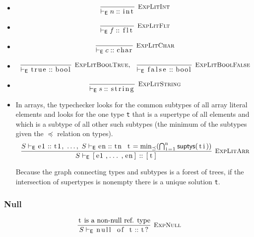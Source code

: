 \documentclass{article}
\newcommand{\code}[1]{\lstinline[columns=fixed]{#1}}
\newcommand{\drmrule}[5]{\frac{#1}{#2\vdash_{\mathsf{#3}}#4}\textsc{\ \small{#5}}}
\newcommand{\ruleapp}[1]{\vdash_{\mathsf{#1}}}
\newcommand{\mc}[1]{\textnormal{\code{#1}}}
\begin{document}
				\begin{itemize}
					\item
						\begin{align*}
							\drmrule{}{}{E}{n :: \mc{int}}{ExpLitInt}
						\end{align*}
					\item
						\begin{align*}
							\drmrule{}{}{E}{f :: \mc{flt}}{ExpLitFlt}
						\end{align*}
					\item
						\begin{align*}
							\drmrule{}{}{E}{c :: \mc{char}}{ExpLitChar}
						\end{align*}
					\item
						\begin{align*}
							\drmrule{}{}{E}{\mc{true} :: \mc{bool}}{ExpLitBoolTrue},\ \ 
							\drmrule{}{}{E}{\mc{false} :: \mc{bool}}{ExpLitBoolFalse}
						\end{align*}
					\item
						\begin{align*}
							\drmrule{}{}{E}{s :: \mc{string}}{ExpLitString}
						\end{align*}
					\item
						In arrays, the typechecker looks for the common subtypes of all array literal elements and looks for the one type \code{t} that is a supertype of all elements and which is a subtype of all other such subtypes (the minimum of the subtypes given the $\preceq$ relation on types).
						\begin{align*}
							\drmrule{S\ruleapp{E}\mc{e1}::\mc{t1},\ \dots,\ S\ruleapp{E}\mc{en}::\mc{tn}\ \ \mc{t} = \min_\preceq (\bigcap_{\mc{i}=\mc{1}}^{\mc{n}}\mathsf{suptys}(\mc{ti}))}{S}{E}{\mc{[e1,...,en]} :: \mc{[t]}}{ExpLitArr}
						\end{align*}
						
						Because the graph connecting types and subtypes is a forest of trees, if the intersection of supertypes is nonempty there is a unique solution \code{t}.
				\end{itemize}
			
			\subsubsection{Null}
			
				\begin{align*}
					\drmrule{\textnormal{\code{t} is a non-null ref. type}}{S}{E}{\mc{null of t} :: \mc{t?}}{ExpNull}
				\end{align*}
			
\end{document}

